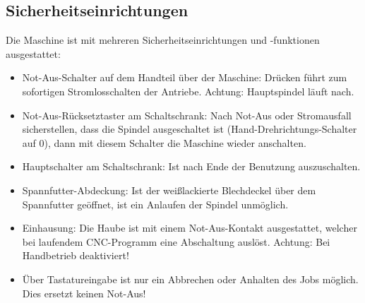 \documentclass{\basedir/fablab-document}
\begin{document}
\subsection{Sicherheitseinrichtungen}
Die Maschine ist mit mehreren Sicherheitseinrichtungen und -funktionen ausgestattet:
\begin{itemize}
	\item Not-Aus-Schalter auf dem Handteil über der Maschine: Drücken führt zum sofortigen Stromlosschalten der Antriebe. Achtung: Hauptspindel läuft nach.
	\item Not-Aus-Rücksetztaster am Schaltschrank: Nach Not-Aus oder Stromausfall sicherstellen, dass die Spindel ausgeschaltet ist (Hand-Drehrichtungs-Schalter auf 0), dann mit diesem Schalter die Maschine wieder anschalten.
	\item Hauptschalter am Schaltschrank: Ist nach Ende der Benutzung auszuschalten.
	\item Spannfutter-Abdeckung: Ist der weißlackierte Blechdeckel über dem Spannfutter geöffnet, ist ein Anlaufen der Spindel unmöglich.
	\item Einhausung: Die Haube ist mit einem Not-Aus-Kontakt ausgestattet, welcher bei laufendem CNC-Programm eine Abschaltung auslöst. Achtung: Bei Handbetrieb deaktiviert!
	\item Über Tastatureingabe ist nur ein Abbrechen oder Anhalten des Jobs möglich. Dies ersetzt keinen Not-Aus!
\end{itemize}


\end{document}
